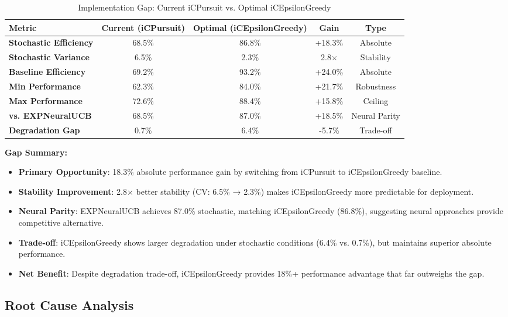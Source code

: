 \documentclass[12pt,a4paper]{article}
\newcommand{\success}[1]{\textcolor{accentgreen}{\textbf{#1}}}
\newcommand{\warning}[1]{\textcolor{warningred}{\textbf{#1}}}
\newcommand{\legacy}[1]{\textcolor{legacycolor}{\textbf{#1}}}
\begin{document}
\begin{table}[H]
\centering
\caption{Implementation Gap: Current iCPursuit vs. Optimal iCEpsilonGreedy}
\label{tab:implementation-gap}
\begin{tabular}{@{}lcccc@{}}
\toprule
\textbf{Metric} & \textbf{Current (iCPursuit)} & \textbf{Optimal (iCEpsilonGreedy)} & \textbf{Gain} & \textbf{Type} \\
\midrule
\warning{Stochastic Efficiency} & 68.5\% & 86.8\% & +18.3\% & Absolute \\
\warning{Stochastic Variance} & 6.5\% & 2.3\% & 2.8$\times$ & Stability \\
\warning{Baseline Efficiency} & 69.2\% & 93.2\% & +24.0\% & Absolute \\
\warning{Min Performance} & 62.3\% & 84.0\% & +21.7\% & Robustness \\
\warning{Max Performance} & 72.6\% & 88.4\% & +15.8\% & Ceiling \\
\legacy{vs. EXPNeuralUCB} & 68.5\% & 87.0\% & +18.5\% & Neural Parity \\
\midrule
\warning{Degradation Gap} & 0.7\% & 6.4\% & -5.7\% & Trade-off \\
\bottomrule
\end{tabular}
\end{table}

\textbf{Gap Summary:}
\begin{itemize}
\item \warning{Primary Opportunity}: 18.3\% absolute performance gain by switching from iCPursuit to iCEpsilonGreedy baseline.
\item \warning{Stability Improvement}: 2.8$\times$ better stability (CV: 6.5\% → 2.3\%) makes iCEpsilonGreedy more predictable for deployment.
\item \warning{Neural Parity}: EXPNeuralUCB achieves 87.0\% stochastic, matching iCEpsilonGreedy (86.8\%), suggesting neural approaches provide competitive alternative.
\item \warning{Trade-off}: iCEpsilonGreedy shows larger degradation under stochastic conditions (6.4\% vs. 0.7\%), but maintains superior absolute performance.
\item \success{Net Benefit}: Despite degradation trade-off, iCEpsilonGreedy provides 18\%+ performance advantage that far outweighs the gap.
\end{itemize}

\subsection{Root Cause Analysis}
\end{document}
